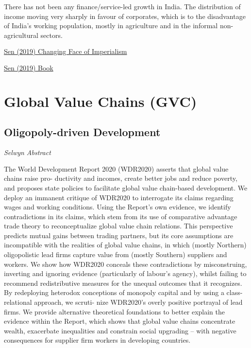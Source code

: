 \documentclass[
]{book}
\begin{document}
There has not been any finance/service-led growth in India.
The distribution of income moving very sharply in favour of corporates, which is to the disadvantage of India's working population, mostly in agriculture and in the informal non-agricultural sectors.

\href{https://developingeconomics.org/2021/04/13/the-changing-face-of-imperialism-colonialism-to-contemporary-capitalism/}{Sen (2019) Changing Face of Imperialism}

\href{https://www.routledge.com/The-Changing-Face-of-Imperialism-Colonialism-to-Contemporary-Capitalism/Sen-Marcuzzo/p/book/9780367890704}{Sen (2019) Book}

\hypertarget{global-value-chains-gvc}{%
\section{Global Value Chains (GVC)}\label{global-value-chains-gvc}}

\hypertarget{oligopoly-driven-development}{%
\subsection{Oligopoly-driven Development}\label{oligopoly-driven-development}}

\emph{Selwyn Abstract}

The World Development Report 2020 (WDR2020) asserts that global value chains raise pro-
ductivity and incomes, create better jobs and reduce poverty, and proposes state policies to
facilitate global value chain-based development. We deploy an immanent critique of WDR2020 to
interrogate its claims regarding wages and working conditions. Using the Report's own evidence,
we identify contradictions in its claims, which stem from its use of comparative advantage trade
theory to reconceptualize global value chain relations. This perspective predicts mutual gains
between trading partners, but its core assumptions are incompatible with the realities of global
value chains, in which (mostly Northern) oligopolistic lead firms capture value from (mostly
Southern) suppliers and workers. We show how WDR2020 conceals these contradictions by
misconstruing, inverting and ignoring evidence (particularly of labour's agency), whilst failing to
recommend redistributive measures for the unequal outcomes that it recognizes. By redeploying
heterodox conceptions of monopoly capital and by using a class-relational approach, we scruti-
nize WDR2020's overly positive portrayal of lead firms. We provide alternative theoretical
foundations to better explain the evidence within the Report, which shows that global value
chains concentrate wealth, exacerbate inequalities and constrain social upgrading -- with negative
consequences for supplier firm workers in developing countries.
\end{document}
